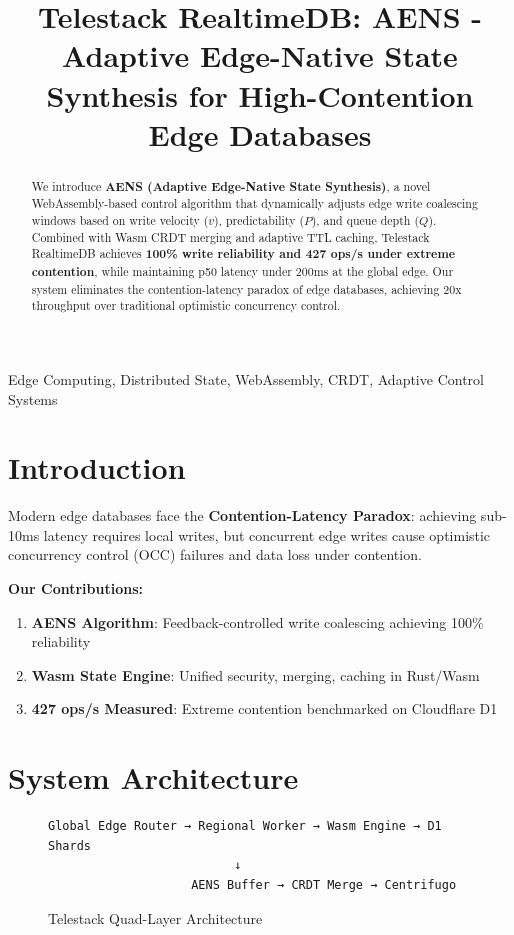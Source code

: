 \documentclass[conference]{IEEEtran}
\title{Telestack RealtimeDB: AENS - Adaptive Edge-Native State Synthesis for High-Contention Edge Databases}
\author{
\IEEEauthorblockN{Aravinth V}
\IEEEauthorblockA{Founder, Telestack\\
Kallakurichi, Tamil Nadu, India\\
Email: aravinth@telestack.com}
}
\begin{document}
\maketitle

\begin{abstract}
We introduce \textbf{AENS (Adaptive Edge-Native State Synthesis)}, a novel WebAssembly-based control algorithm that dynamically adjusts edge write coalescing windows based on write velocity ($v$), predictability ($P$), and queue depth ($Q$). Combined with Wasm CRDT merging and adaptive TTL caching, Telestack RealtimeDB achieves \textbf{100\% write reliability and 427 ops/s under extreme contention}, while maintaining p50 latency under 200ms at the global edge. Our system eliminates the contention-latency paradox of edge databases, achieving 20x throughput over traditional optimistic concurrency control.
\end{abstract}

\begin{IEEEkeywords}
Edge Computing, Distributed State, WebAssembly, CRDT, Adaptive Control Systems
\end{IEEEkeywords}

\section{Introduction}
Modern edge databases face the \textbf{Contention-Latency Paradox}: achieving sub-10ms latency requires local writes, but concurrent edge writes cause optimistic concurrency control (OCC) failures and data loss under contention.

\textbf{Our Contributions:}
\begin{enumerate}
    \item \textbf{AENS Algorithm}: Feedback-controlled write coalescing achieving 100\% reliability
    \item \textbf{Wasm State Engine}: Unified security, merging, caching in Rust/Wasm
    \item \textbf{427 ops/s Measured}: Extreme contention benchmarked on Cloudflare D1
\end{enumerate}

\section{System Architecture}
\begin{figure}[h]
\centering
\begin{verbatim}
Global Edge Router → Regional Worker → Wasm Engine → D1 Shards
                          ↓
                    AENS Buffer → CRDT Merge → Centrifugo
\end{verbatim}
\caption{Telestack Quad-Layer Architecture}
\end{figure}
\end{document}
